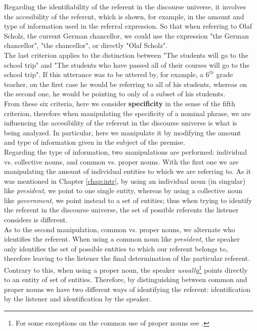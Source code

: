 Regarding the identifiability of the referent in the discourse universe, it involves the accesibility of the referent, which is shown, for example, in the amount and type of information used in the referral expression. So that when referring to Olaf Scholz, the current German chancellor, we could use the expression "the German chancellor", "the chancellor", or directly "Olaf Scholz".\\  
The last criterion applies to the distinction between "The students will go to the school trip" and "The students who have passed all of their courses will go to the school trip". If this utterance was to be uttered by, for example, a $6^{th}$ grade teacher, on the first case he would be referring to all of his students, whereas on the second one, he would be pointing to only of a subset of his studemts.\\ 

From these six criteria, here we consider \textbf{specificity} in the sense of the fifth criterion, therefore when manipulating the specificity of a nominal phrase, we are influencing the accesibility of the referent in the discourse universe is what is being analyzed. In particular, here we manipulate it by modifying the amount and type of information given in the subject of the premise.\\ 

Regarding the type of information, two manipulations are performed: individual vs. collective nouns, and common vs. proper nouns. With the first one we are manipulating the amount of individual entities to which we are referring to. As it was mentioned in Chapter \ref{chap:intr}, by using an individual noun (in singular) like \textit{president}, we point to one single entity, whereas by using a collective noun like \textit{government}, we point instead to a set of entities; thus when trying to identify the referent in the discourse universe, the set of possible referents the listener considers is different.\\

As to the second manipulation, common vs. proper nouns, we alternate who identifies the referent. When using a common noun like \textit{president}, the speaker only identifies the set of possible entities to which our referent belongs to, therefore leaving to the listener the final determination of the particular referent. Contrary to this, when using a proper noun, the speaker \textit{usually}\footnote{For some exceptions on the common use of proper nouns see \citet{caudet1999expresiones}.} points directly to an entity of set of entities. Therefore, by distinguishing between common and proper nouns we have two different ways of identifying the referent: identification by the listener and identification by the speaker.\\

